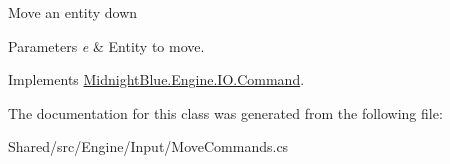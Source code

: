 Move an entity down 


\begin{DoxyParams}{Parameters}
{\em e} & Entity to move.\\
\hline
\end{DoxyParams}


Implements \hyperlink{class_midnight_blue_1_1_engine_1_1_i_o_1_1_command_ae641d2c1a9db17f03ee6b7854b00a9d2}{Midnight\+Blue.\+Engine.\+I\+O.\+Command}.



The documentation for this class was generated from the following file\+:\begin{DoxyCompactItemize}
\item 
Shared/src/\+Engine/\+Input/Move\+Commands.\+cs\end{DoxyCompactItemize}
